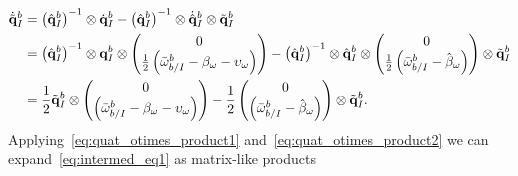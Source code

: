 \begin{align}
  \dot{\tilde{\mathrm{\mathbf{q}}}}_I^b &=
  \left( \hat{\mathrm{\mathbf{q}}}_I^b \right)^{-1} \otimes \dot{\mathrm{\mathbf{q}}}_I^b  - \left( \hat{\mathrm{\mathbf{q}}}_I^b
  \right)^{-1} \otimes \dot{\hat{\mathrm{\mathbf{q}}}}_I^b \otimes \tilde{\mathrm{\mathbf{q}}}_I^b
  \\
  &=
  \left( \hat{\mathrm{\mathbf{q}}}_I^b \right)^{-1} \otimes \mathrm{\mathbf{q}}_I^b \otimes
  \begin{pmatrix}
    0 \\
    \frac{1}{2} \left( \bar{\mathrm{\mathbf{\omega}}}_{b/I}^b - \mathrm{\mathbf{\beta}}_\omega
    -\mathrm{\mathbf{\upsilon}}_\omega \right)
  \end{pmatrix}
  - \left( \hat{\mathrm{\mathbf{q}}}_I^b
  \right)^{-1} \otimes \hat{\mathrm{\mathbf{q}}}_I^b \otimes
  \begin{pmatrix}
    0 \\
    \frac{1}{2} \left( \bar{\mathrm{\mathbf{\omega}}}_{b/I}^b - \hat{\mathrm{\mathbf{\beta}}}_\omega
    \right)
  \end{pmatrix}
  \otimes \tilde{\mathrm{\mathbf{q}}}_I^b
  \\
  &=
  \label{eq:intermed_eq1}
  \frac{1}{2} \tilde{\mathrm{\mathbf{q}}}_I^b \otimes
  \begin{pmatrix}
    0 \\
    \left( \bar{\mathrm{\mathbf{\omega}}}_{b/I}^b - \mathrm{\mathbf{\beta}}_\omega -
    \mathrm{\mathbf{\upsilon}}_\omega \right)
  \end{pmatrix}
  - \frac{1}{2}
  \begin{pmatrix}
    0 \\
    \left( \bar{\mathrm{\mathbf{\omega}}}_{b/I}^b - \hat{\mathrm{\mathbf{\beta}}}_\omega \right)
  \end{pmatrix}
  \otimes \tilde{\mathrm{\mathbf{q}}}_I^b.
\end{align}
Applying~\eqref{eq:quat_otimes_product1} and~\eqref{eq:quat_otimes_product2} 
we can expand~\eqref{eq:intermed_eq1} as matrix-like products
